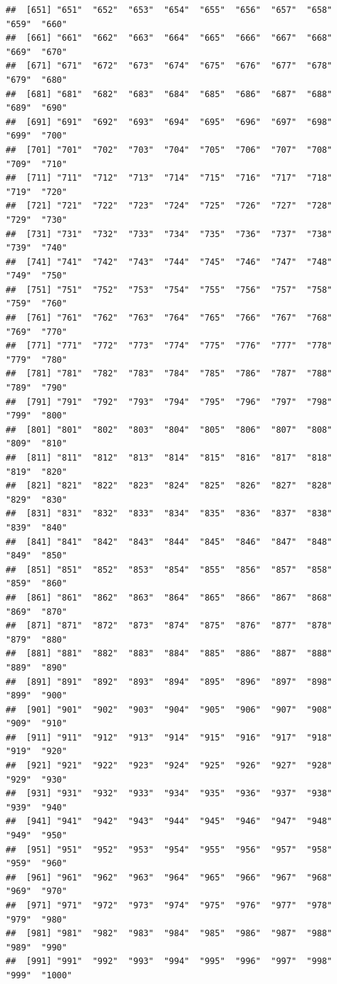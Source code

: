 \documentclass[]{book}
\begin{document}
\begin{verbatim}
##  [651] "651"  "652"  "653"  "654"  "655"  "656"  "657"  "658"  "659"  "660" 
##  [661] "661"  "662"  "663"  "664"  "665"  "666"  "667"  "668"  "669"  "670" 
##  [671] "671"  "672"  "673"  "674"  "675"  "676"  "677"  "678"  "679"  "680" 
##  [681] "681"  "682"  "683"  "684"  "685"  "686"  "687"  "688"  "689"  "690" 
##  [691] "691"  "692"  "693"  "694"  "695"  "696"  "697"  "698"  "699"  "700" 
##  [701] "701"  "702"  "703"  "704"  "705"  "706"  "707"  "708"  "709"  "710" 
##  [711] "711"  "712"  "713"  "714"  "715"  "716"  "717"  "718"  "719"  "720" 
##  [721] "721"  "722"  "723"  "724"  "725"  "726"  "727"  "728"  "729"  "730" 
##  [731] "731"  "732"  "733"  "734"  "735"  "736"  "737"  "738"  "739"  "740" 
##  [741] "741"  "742"  "743"  "744"  "745"  "746"  "747"  "748"  "749"  "750" 
##  [751] "751"  "752"  "753"  "754"  "755"  "756"  "757"  "758"  "759"  "760" 
##  [761] "761"  "762"  "763"  "764"  "765"  "766"  "767"  "768"  "769"  "770" 
##  [771] "771"  "772"  "773"  "774"  "775"  "776"  "777"  "778"  "779"  "780" 
##  [781] "781"  "782"  "783"  "784"  "785"  "786"  "787"  "788"  "789"  "790" 
##  [791] "791"  "792"  "793"  "794"  "795"  "796"  "797"  "798"  "799"  "800" 
##  [801] "801"  "802"  "803"  "804"  "805"  "806"  "807"  "808"  "809"  "810" 
##  [811] "811"  "812"  "813"  "814"  "815"  "816"  "817"  "818"  "819"  "820" 
##  [821] "821"  "822"  "823"  "824"  "825"  "826"  "827"  "828"  "829"  "830" 
##  [831] "831"  "832"  "833"  "834"  "835"  "836"  "837"  "838"  "839"  "840" 
##  [841] "841"  "842"  "843"  "844"  "845"  "846"  "847"  "848"  "849"  "850" 
##  [851] "851"  "852"  "853"  "854"  "855"  "856"  "857"  "858"  "859"  "860" 
##  [861] "861"  "862"  "863"  "864"  "865"  "866"  "867"  "868"  "869"  "870" 
##  [871] "871"  "872"  "873"  "874"  "875"  "876"  "877"  "878"  "879"  "880" 
##  [881] "881"  "882"  "883"  "884"  "885"  "886"  "887"  "888"  "889"  "890" 
##  [891] "891"  "892"  "893"  "894"  "895"  "896"  "897"  "898"  "899"  "900" 
##  [901] "901"  "902"  "903"  "904"  "905"  "906"  "907"  "908"  "909"  "910" 
##  [911] "911"  "912"  "913"  "914"  "915"  "916"  "917"  "918"  "919"  "920" 
##  [921] "921"  "922"  "923"  "924"  "925"  "926"  "927"  "928"  "929"  "930" 
##  [931] "931"  "932"  "933"  "934"  "935"  "936"  "937"  "938"  "939"  "940" 
##  [941] "941"  "942"  "943"  "944"  "945"  "946"  "947"  "948"  "949"  "950" 
##  [951] "951"  "952"  "953"  "954"  "955"  "956"  "957"  "958"  "959"  "960" 
##  [961] "961"  "962"  "963"  "964"  "965"  "966"  "967"  "968"  "969"  "970" 
##  [971] "971"  "972"  "973"  "974"  "975"  "976"  "977"  "978"  "979"  "980" 
##  [981] "981"  "982"  "983"  "984"  "985"  "986"  "987"  "988"  "989"  "990" 
##  [991] "991"  "992"  "993"  "994"  "995"  "996"  "997"  "998"  "999"  "1000"
\end{verbatim}
\end{document}
